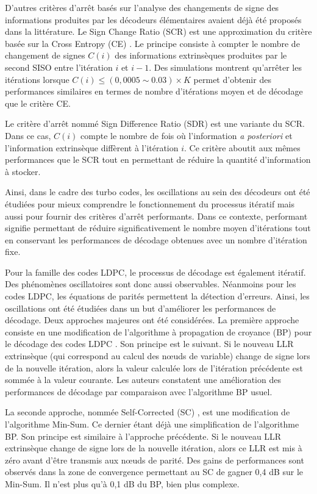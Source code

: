 D'autres critères d'arrêt basés sur l'analyse des changements de signe des informations produites par les décodeurs 
élémentaires avaient déjà été proposés dans la littérature. Le Sign Change Ratio (SCR) \cite{fossorier_scr} est une 
approximation du critère basée sur la Cross Entropy (CE) \cite{hagenauer_ce}. Le principe consiste à compter le nombre de 
changement de signes $C(i)$ des informations extrinsèques produites par le second SISO entre l'itération $i$ et $i-1$. 
Des simulations montrent qu'arrêter les itérations lorsque $C(i)\leq (0,0005 \sim 0.03)\times K$ permet d'obtenir des 
performances similaires en termes de nombre d'itérations moyen et de décodage que le critère CE.

Le critère d'arrêt nommé Sign Difference Ratio (SDR) \cite{fossorier_scr} est une variante du SCR. Dans ce cas, $C(i)$ 
compte le nombre de fois où l'information \textit{a posteriori} et l'information extrinsèque diffèrent à l'itération $i$. 
Ce critère aboutit aux mêmes performances que le SCR tout en permettant de réduire la quantité d'information à stocker.

Ainsi, dans le cadre des turbo codes, les oscillations au sein des décodeurs ont été étudiées pour mieux comprendre le 
fonctionnement du processus itératif mais aussi pour fournir des critères d'arrêt performants. Dans ce contexte, performant 
signifie permettant de réduire significativement le nombre moyen d'itérations tout en conservant les performances de 
décodage obtenues avec un nombre d'itération fixe.

Pour la famille des codes LDPC, le processus de décodage est également itératif. Des phénomènes oscillatoires sont donc aussi 
observables. Néanmoins pour les codes LDPC, les équations de parités permettent la détection d'erreurs. Ainsi, 
les oscillations ont été étudiées dans un but d'améliorer les performances de décodage. Deux approches majeures ont été 
considérées. La première approche consiste en une modification de l'algorithme à propagation de croyance (BP) pour le 
décodage des codes LDPC \cite{gounai_bp_osc}. Son principe est le suivant. Si le nouveau LLR extrinsèque (qui correspond 
au calcul des nœuds de variable) change de signe lors de la nouvelle itération, alors la valeur calculée lors de 
l'itération précédente est sommée à la valeur courante. Les auteurs constatent une amélioration des performances de décodage par 
comparaison avec l'algorithme BP usuel.

La seconde approche, nommée Self-Corrected (SC) \cite{savin_sc}, est une modification de l'algorithme Min-Sum. Ce dernier 
étant déjà une simplification de l'algorithme BP. Son principe est similaire à l'approche précédente. Si le nouveau LLR 
extrinsèque change de signe lors de la nouvelle itération, alors ce LLR est mis à zéro avant d'être transmis aux nœuds de 
parité. Des gains de performances sont observés dans la zone de convergence permettant au SC de gagner 0,4 dB sur le 
Min-Sum. Il n'est plus qu'à 0,1 dB du BP, bien plus complexe.

